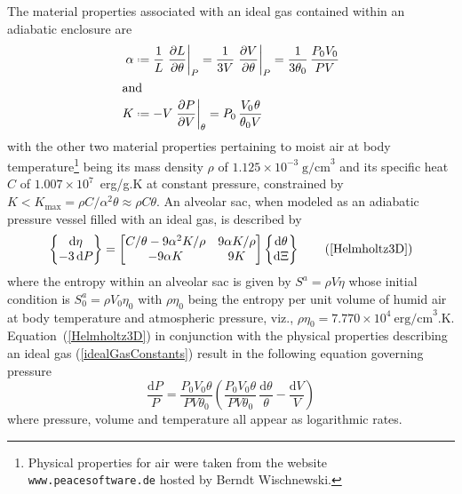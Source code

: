 The material properties associated with an ideal gas contained within an adiabatic enclosure are
\begin{subequations}
    \label{idealGasConstants}
    \begin{align}
\alpha & \defeq \frac{1}{L} \left. \frac{\partial L}{\partial \theta} \right|_P =
\frac{1}{3V} \left. \frac{\partial V}{\partial \theta} \right|_P = 
\frac{1}{3\theta_0} \, \frac{P_0 V_0}{P V} \\
\intertext{and}
K & \defeq -V \left. \frac{\partial P}{\partial V} \right|_{\theta} = 
P_0 \, \frac{V_0 \hspace{0.5pt} \theta}{\theta_0 V}
\end{align}
\end{subequations}
with the other two material properties pertaining to moist air at body temperature\footnote{
    Physical properties for air were taken from the website \texttt{www.peacesoftware.de} hosted by Berndt Wischnewski.
}
being its mass density $\rho$ of $1.125 \times 10^{-3} \; \text{g/cm}^3$ and its specific heat $C$ of $1.007 \times 10^7$~erg/g.K at constant pressure, constrained by $K < K_{\max} = \rho C / \alpha^2 \theta \approx \rho C \theta$.  An alveolar sac, when modeled as an adiabatic pressure vessel filled with an ideal gas, is described by
\begin{equation}
\left\{ \begin{matrix}
    \mathrm{d} \eta \\ -3 \, \mathrm{d} P
\end{matrix} \right\} = \begin{bmatrix}
    C / \theta - 9 \alpha^2 K / \rho & 
    9 \alpha K / \rho \\
    -9 \alpha K & 9 K
\end{bmatrix} \left\{ \begin{matrix}
    \mathrm{d} \theta \\ \mathrm{d} \Xi
\end{matrix} \right\}
\tag{\ref{Helmholtz3D}}
\end{equation}
where the entropy within an alveolar sac is given by $S^a = \rho V \eta$ whose initial condition is $S^a_0 = \rho V_0 \eta_0$ with $\rho \eta_0$ being the entropy per unit volume of humid air at body temperature and atmospheric pressure, viz., $\rho \eta_0 = 7.770 \times 10^4 \: \text{erg/cm}^3\text{.K}$.  Equation~(\ref{Helmholtz3D}) in conjunction with the physical properties describing an ideal gas (\ref{idealGasConstants}) result in the following equation governing pressure
\begin{displaymath}
\frac{\mathrm{d} P}{P} = \frac{P_0 V_0 \theta}{P V \theta_0} \left( 
\frac{P_0 V_0 \theta}{P V \theta_0} \, \frac{\mathrm{d} \theta}{\theta} - 
\frac{\mathrm{d} V}{V} \right)
\end{displaymath}
where pressure, volume and temperature all appear as logarithmic rates.

